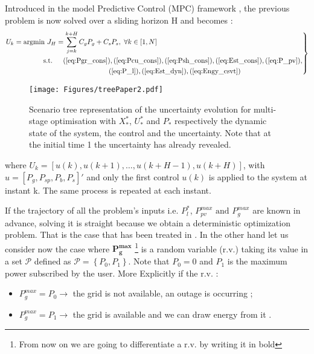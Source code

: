 \documentclass[conference]{IEEEtran}
\begin{document}
Introduced in the model Predictive Control (MPC) framework \cite{ECaCbo2007}, the previous problem is now solved over a sliding horizon H and becomes : 
\begin{equation}\label{eq:MPCsys}
\left. 
\begin{aligned}
&U_k = \text{argmin } J_H = \sum_{j=k}^{k+H} C_gP_g + C_sP_s, \hspace{3px} \forall k \in [1, N] \\
& \text{\hspace{50px} s.t.\hspace{15px}} (\ref{eq:Pgr_cons}),(\ref{eq:Pcu_cons}),(\ref{eq:Psh_cons}), (\ref{eq:Est_cons}),  (\ref{eq:P_pv}),\\
& \text{\hspace{147px}}(\ref{eq:P_l}), (\ref{eq:Est_dyn}),(\ref{eq:Engy_csvt})
\end{aligned}\right \}
\end{equation}

\begin{figure}[!b]
         \centering
    \texttt{[image: Figures/treePaper2.pdf]}
    \caption{Scenario tree representation of the uncertainty evolution for multi-stage optimisation with $X_*^*$, $U_*^*$ and $P_*$ respectively the dynamic state of the system, the control and the uncertainty. Note that at  the initial time 1  the uncertainty has already revealed. 
}
    \label{fig:Snr_tree}
\end{figure}
\noindent where $U_k = [u(k), u(k+1), \ldots,u(k+H-1), u(k+H)]$, with  $u = [ P_g,P_{sp},P_b,P_s]'$ and only the first control $u(k)$ is applied to the system at instant k. The same process is repeated at each instant. 

If the trajectory of all the problem's inputs i.e. $P_l^*$, $P_{pv}^{max}  \text{ and } P_g^{max}$ are known in advance, solving it is straight because we obtain a deterministic optimization problem. 
That is the case that has been treated in \cite{JPrPHa2019}. In the other hand let us consider now the case where $\textbf{P}_\textbf{g}^{\textbf{max}}$ \footnote{From now on we are going to differentiate  a r.v. by writing it in bold}  is a random variable (r.v.) taking its value in a set $\mathcal{P}$ defined as $ \mathcal{P} = \left \{ P_0 , P_1\right \}$. Note that $P_0=0$ and $P_1$ is the maximum power subscribed by the user. More Explicitly if the r.v. : \begin{itemize}
\item $P_g^{max} = P_0 \rightarrow$ the grid is not available, an outage is occurring ; 
\item $P_g^{max} = P_1 \rightarrow$ the grid is available and we can draw energy from it . 
\end{itemize}
\end{document}
